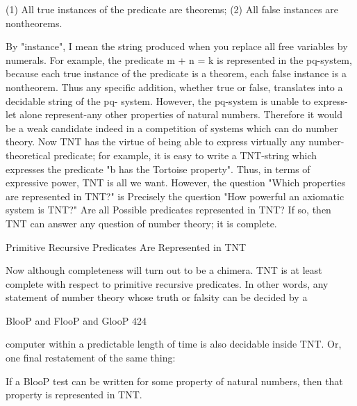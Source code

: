      (1) All true instances of the predicate are theorems;
     (2) All false instances are nontheorems.

By "instance", I mean the string produced when you replace all free variables by
numerals. For example, the predicate m + n = k is represented in the pq-system, because
each true instance of the predicate is a theorem, each false instance is a nontheorem. Thus
any specific addition, whether true or false, translates into a decidable string of the pq-
system. However, the pq-system is unable to express-let alone represent-any other
properties of natural numbers. Therefore it would be a weak candidate indeed in a
competition of systems which can do number theory.
        Now TNT has the virtue of being able to express virtually any number-theoretical
predicate; for example, it is easy to write a TNT-string which expresses the predicate "b
has the Tortoise property". Thus, in terms of expressive power, TNT is all we want.
        However, the question "Which properties are represented in TNT?" is Precisely
the question "How powerful an axiomatic system is TNT?" Are all Possible predicates
represented in TNT? If so, then TNT can answer any question of number theory; it is
complete.

          Primitive Recursive Predicates Are Represented in TNT

Now although completeness will turn out to be a chimera. TNT is at least complete with
respect to primitive recursive predicates. In other words, any statement of number theory
whose truth or falsity can be decided by a




BlooP and FlooP and GlooP                                                              424

computer within a predictable length of time is also decidable inside TNT. Or, one final
restatement of the same thing:

      If a BlooP test can be written for some property of natural numbers, then that
      property is represented in TNT.


